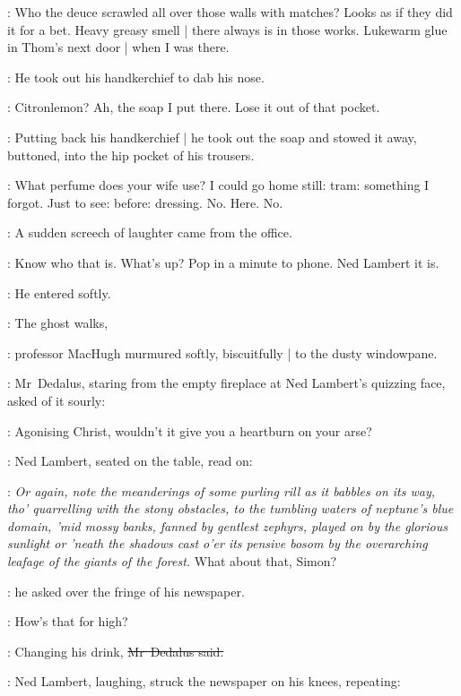 \BloomInt:
Who the deuce scrawled all over those walls with matches?
Looks as if they did it for a bet.
Heavy greasy smell |
there always is in those works.
Lukewarm glue in Thom's next door |
when I was there.

:
He took out his handkerchief to dab his nose.

\BloomInt:
Citronlemon?
Ah, the soap I put there.
Lose it out of that pocket.

:
Putting back his handkerchief |
he took out the soap and stowed it away,
buttoned,
into the hip pocket of his trousers.

\BloomInt:
What perfume does your wife use?
I could go home still:
tram: something I forgot.
Just to see: before:
dressing.
No.
Here.
No.

:
A sudden screech of laughter came from the  office.

\BloomInt:
Know who that is.
What's up?
Pop in a minute to phone.
Ned Lambert it is.

:
He entered softly.



\machugh:
The ghost walks,

:
professor MacHugh murmured softly, biscuitfully |
to the dusty windowpane.

:
Mr~Dedalus,
staring from the empty fireplace at Ned Lambert's quizzing face,
asked of it sourly:

\simon:
Agonising Christ,
wouldn't it give you a heartburn on your arse?

:
Ned Lambert, seated on the table, read on:

\lambert:
\stage{[as Dawson]}
\emph{%
Or again, note the meanderings of some purling rill
as it babbles on its way,
tho' quarrelling with the stony obstacles,
to the tumbling waters of neptune's blue domain,
'mid mossy banks,
fanned by gentlest zephyrs,
played on by the glorious sunlight
or 'neath the shadows cast o'er its pensive bosom
by the overarching leafage of the giants of the forest.}
What about that, Simon?

:
he asked over the fringe of his newspaper.

\lambert:
How's that for high?

\simon:
Changing his drink,
\sout{Mr~Dedalus said.}

:
Ned Lambert, laughing,
struck the newspaper on his knees,
repeating:

